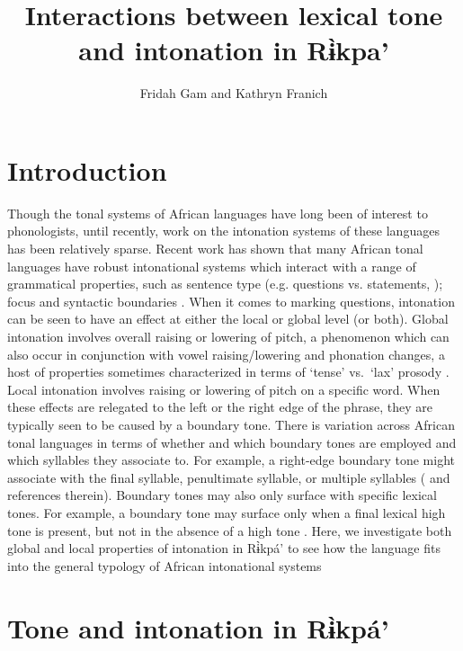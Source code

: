 \documentclass[output=paper,colorlinks,citecolor=brown
]{langscibook}
\author{Fridah Gam\affiliation{University of Yaoundé I} and Kathryn Franich\affiliation{Harvard University}}
\title{Interactions between lexical tone and intonation in Rɨ̀kpa'}
\begin{document}
\maketitle

\section{Introduction}
\label{sec:gamfranich:1}

Though the tonal systems of African languages have long been of interest to phonologists, until recently, work on the intonation systems of these languages has been relatively sparse. Recent work has shown that many African tonal languages have robust intonational systems which interact with a range of grammatical properties, such as sentence type (e.g. questions vs. statements, \citealp{ChaiEtAl2022, Downing2017, GjersøeEtAl2016, KulaHamann2017, Patin2017, Rialland2007, RiallandAborobongui2017}); focus \citep{Inkelas1998, Kügler2017, Kisseberth2017, Patin2017} and syntactic boundaries \citep{ChaiEtAl2022}. When it comes to marking questions, intonation can be seen to have an effect at either the local or global level (or both). Global intonation involves overall raising or lowering of pitch, a phenomenon which can also occur in conjunction with vowel raising/lowering and phonation changes, a host of properties sometimes characterized in terms of ‘tense’ vs.\ ‘lax’ prosody \citep{Lindsey1985, Rialland2007, DowningRialland2017}. Local intonation involves raising or lowering of pitch on a specific word. When these effects are relegated to the left or the right edge of the phrase, they are typically seen to be caused by a boundary tone. There is variation across African tonal languages in terms of whether and which boundary tones are employed and which syllables they associate to. For example, a right-edge boundary tone might associate with the final syllable, penultimate syllable, or multiple syllables (\citealp{Rialland2007} and references therein). Boundary tones may also only surface with specific lexical tones. For example, a boundary tone may surface only when a final lexical high tone is present, but not in the absence of a high tone \citep{Patin2017}. Here, we investigate both global and local properties of intonation in Rɨ̀kpá' to see how the language fits into the general typology of African intonational systems

\section{Tone and intonation in Rɨ̀kpá'}
\label{sec:gamfranich:2}
\end{document}

